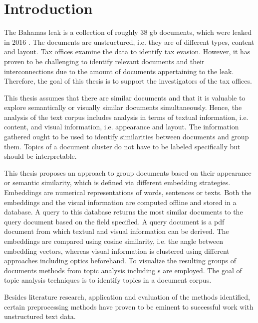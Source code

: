 \chapter{Introduction}\label{ch:introduction}

The Bahamas leak is a collection of roughly 38 \ac{gb} documents, which were leaked in 2016 \cite{data-corpus-bahamas-leaks}.
The documents are unstructured, i.e. they are of different types, content and layout.
Tax offices examine the data to identify tax evasion.
However, it has proven to be challenging to identify relevant documents and their interconnections due to the amount of documents appertaining to the leak.
Therefore, the goal of this thesis is to support the investigators of the tax offices.

This thesis assumes that there are similar documents and that it is valuable to explore semantically or visually similar documents simultaneously.
Hence, the analysis of the text corpus includes analysis in terms of textual information, i.e. content, 
and visual information, i.e. appearance and layout.
The information gathered ought to be used to identify similarities between documents and group them.
Topics of a document cluster do not have to be labeled specifically but should be interpretable.

This thesis proposes an approach to group documents based on their appearance or semantic similarity, 
which is defined via different embedding strategies.
Embeddings are numerical representations of words, sentences or texts.
Both the embeddings and the visual information are computed offline and stored in a database.
A query to this database returns the most similar documents to the query document based on the field specified.
A query document is a \ac{pdf} document from which textual and visual information can be derived.
The embeddings are compared using cosine similarity, i.e. the angle between embedding vectors, 
whereas visual information is clustered using different approaches including \ac{optics} beforehand.
To visualize the resulting groups of documents methods from topic analysis including \wordcloud{}s are employed.
The goal of topic analysis techniques is to identify topics in a document corpus.

Besides literature research, application and evaluation of the methods identified, 
certain preprocessing methods have proven to be eminent to successful work with unstructured text data.
